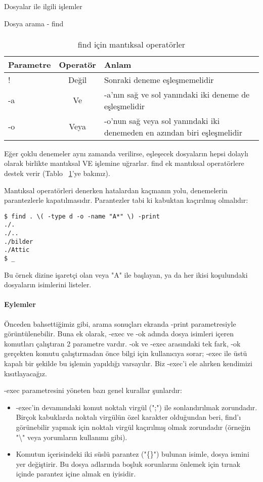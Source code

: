 \begin{section}{Dosyalar ile ilgili işlemler}
\begin{subsection}{Dosya arama - find}
\paragraph{}{
\begin {table}[H]
\caption {find için mantıksal operatörler} \label{tab:tablo67} 
\begin{tabular}{l c l}
\hline
Parametre & Operatör & Anlam\\
\hline
! & Değil & Sonraki deneme eşleşmemelidir\\
-a & Ve & -a'nın sağ ve sol yanındaki iki deneme de eşleşmelidir\\
-o & Veya & -o'nun sağ veya sol yanındaki iki denemeden en azından biri eşleşmelidir\\
\hline
\end{tabular}
\end {table}
}

Eğer çoklu denemeler aynı zamanda verilirse, eşleşecek dosyaların hepsi dolaylı olarak birlikte mantıksal VE işlemine uğrarlar. find ek mantıksal operatörlere destek verir (Tablo ~\ref{tab:tablo67}'ye bakınız).

Mantıksal operatörleri denerken hatalardan kaçmanın yolu, denemelerin parantezlerle kapatılmasıdır. Parantezler tabi ki kabuktan kaçırılmış olmalıdır:

\begin{verbatim}
$ find . \( -type d -o -name "A*" \) -print
./.
./..
./bilder
./Attic
$ _
\end{verbatim}

Bu örnek dizine işaretçi olan veya "A" ile başlayan, ya da her ikisi koşulundaki dosyaların isimlerini listeler.

\paragraph{Eylemler} Önceden bahsettiğimiz gibi, arama sonuçları ekranda -print parametresiyle görüntülenebilir. Buna ek olarak, -exec ve -ok adında dosya isimleri içeren komutları çalıştıran 2 parametre vardır. -ok ve -exec arasındaki tek fark, -ok gerçekten komutu çalıştırmadan önce bilgi için kullanıcıya sorar; -exec ile üstü kapalı bir şekilde bu işlemin yapıldığı varsayılır. Biz -exec'i ele alırken kendimizi kısıtlayacağız.

-exec parametresini yöneten bazı genel kurallar şunlardır:
\begin{itemize}
\item -exec'in devamındaki komut noktalı virgül (";") ile sonlandırılmak zorundadır. Birçok kabuklarda noktalı virgülün özel karakter olduğundan beri, find'ı görünebilir yapmak için noktalı virgül kaçırılmış olmak zorundadır (örneğin "\textbackslash" veya yorumların kullanımı gibi).
\item Komutun içerisindeki iki süslü parantez ("\{\}") bulunan isimle, dosya ismini yer değiştirir. Bu dosya adlarında boşluk sorunlarını önlemek için tırnak içinde parantez içine almak en iyisidir.
\end{itemize}


\end{subsection}
\end{section}
